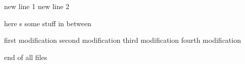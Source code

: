 new line 1
new line 2


here s some stuff in between


first modification
second modification
third modification
fourth modification

end of all files
